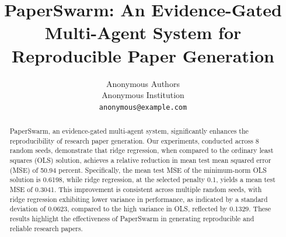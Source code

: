 \documentclass{article}
\title{PaperSwarm: An Evidence-Gated Multi-Agent System for Reproducible Paper Generation}
\author{Anonymous Authors \\
Anonymous Institution \\
\texttt{anonymous@example.com}}
\begin{document}
\maketitle

\begin{abstract}
PaperSwarm, an evidence-gated multi-agent system, significantly enhances the reproducibility of research paper generation. Our experiments, conducted across 8 random seeds, demonstrate that ridge regression, when compared to the ordinary least squares (OLS) solution, achieves a relative reduction in mean test mean squared error (MSE) of 50.94 percent. Specifically, the mean test MSE of the minimum-norm OLS solution is 0.6198, while ridge regression, at the selected penalty 0.1, yields a mean test MSE of 0.3041. This improvement is consistent across multiple random seeds, with ridge regression exhibiting lower variance in performance, as indicated by a standard deviation of 0.0623, compared to the high variance in OLS, reflected by 0.1329. These results highlight the effectiveness of PaperSwarm in generating reproducible and reliable research papers.
\end{abstract}










\end{document}
